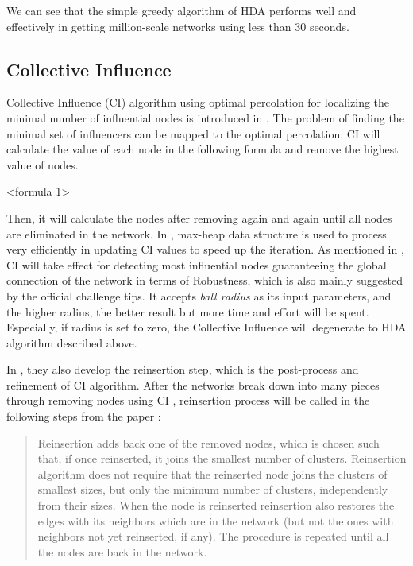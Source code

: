 \documentclass{article}
\newenvironment{itquote}
{\begin{quote}\itshape}
	{\end{quote}\ignorespacesafterend}
\begin{document}
	We can see that the simple greedy algorithm of HDA performs well and effectively in getting million-scale networks using less than 30 seconds. 


	\subsection{Collective Influence}		

	Collective Influence (CI) algorithm using optimal percolation for localizing the minimal number of influential nodes is introduced in \cite{morone2015influence} \cite{morone2016collective}. The problem of finding the minimal set of influencers can be mapped to the optimal percolation. CI will calculate the value of each node in the following formula and remove the highest value of nodes. 
	
	
	<formula 1>
	
	 Then, it will calculate the nodes after removing again and again until all nodes are eliminated in the network. In \cite{morone2016collective},  max-heap data structure is used to process very efficiently in updating CI values to speed up the iteration. As mentioned in \cite{lu2016vital}, CI will take effect for detecting most influential nodes guaranteeing the global connection of the network in terms of Robustness, which is also mainly suggested by the official challenge tips. It accepts \textit{ball radius} as its input parameters, and the higher radius, the better result but more time and effort will be spent. Especially, if radius is set to zero, the Collective Influence will degenerate to HDA algorithm described above.
	
	In \cite{morone2015influence} \cite{morone2016collective}, they also develop the reinsertion step, which is the post-process and  refinement of CI algorithm. After the networks break down into many pieces through removing nodes using CI , reinsertion process will be called in the following steps from the paper \cite{morone2016collective} : 
	
	\begin{itquote}
	
		Reinsertion adds back one of the removed nodes, which is chosen such that, if once reinserted, it joins the smallest number of clusters. Reinsertion algorithm does not require that the reinserted node joins the clusters of smallest sizes, but only the minimum number of clusters, independently from their sizes. When the node is reinserted reinsertion also restores the edges with its neighbors which are in the network (but not the ones with neighbors not yet reinserted, if any). The procedure is repeated until all the nodes are back in the network. 
	
	\end{itquote}
	
\end{document}
